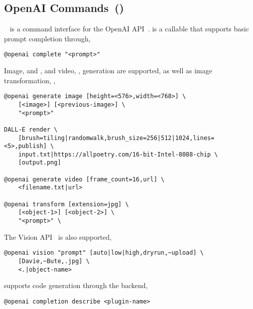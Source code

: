 \subsection{OpenAI Commands~()}\label{openai_commands}

~\cite{openai_commands} is a command interface for the OpenAI API~\cite{openai_api}.  is a callable that supports basic prompt completion through,
%
\begin{verbatim}
@openai complete "<prompt>"
\end{verbatim}
%
Image,  and , and video, , generation are supported, as well as image transformation, ,
%
\begin{verbatim}
@openai generate image [height=<576>,width=<768>] \
    [<image>] [<previous-image>] \
    "<prompt>"

DALL-E render \
    [brush=tiling|randomwalk,brush_size=256|512|1024,lines=<5>,publish] \
    input.txt|https://allpoetry.com/16-bit-Intel-8088-chip \
    [output.png]

@openai generate video [frame_count=16,url] \
    <filename.txt|url>

@openai transform [extension=jpg] \
    [<object-1>] [<object-2>] \
    "<prompt>" \
\end{verbatim}
%
The Vision API~\cite{openai_vision} is also supported,
%
\begin{verbatim}
@openai vision "prompt" [auto|low|high,dryrun,~upload] \
    [Davie,~Bute,.jpg] \
    <.|object-name>
\end{verbatim}
%
\keyword{@openai} supports code generation through the  backend,
%
\begin{verbatim}
@openai completion describe <plugin-name>
\end{verbatim}